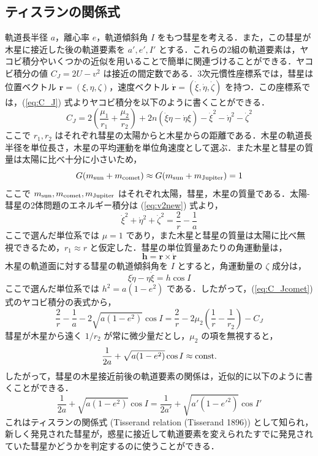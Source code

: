 \documentclass[11pt,a4paper,oneside,onecolumn]{jarticle}
\begin{document}
\subsection{ティスランの関係式}
軌道長半径 $a$，離心率 $e$，軌道傾斜角 $I$ をもつ彗星を考える．また，この彗星が木星に接近した後の軌道要素を $a', e', I'$ とする．これらの2組の軌道要素は，ヤコビ積分やいくつかの近似を用いることで簡単に関連づけることができる．ヤコビ積分の値 $C_J = 2 U - v^2$ は接近の間定数である．3次元慣性座標系では，彗星は位置ベクトル ${\bm r} = (\xi, \eta, \zeta)$，速度ベクトル $\dot{{\bm r}} = (\dot{\xi}, \dot{\eta}, \dot{\zeta})$ を持つ．この座標系では，(\ref{eq:C_J}) 式よりヤコビ積分を以下のように書くことができる．
\begin{equation}
C_J = 2 \left( \frac{\mu_1}{r_1} + \frac{\mu_2}{r_2} \right) + 2 n (\dot{\xi} \eta - \dot{\eta} \xi) - \dot{\xi}^2 - \dot{\eta}^2 - \dot{\zeta}^2 \label{eq:C_Jcomet}
\end{equation}
ここで $r_1, r_2$ はそれぞれ彗星の太陽からと木星からの距離である．木星の軌道長半径を単位長さ，木星の平均運動を単位角速度として選ぶ．また木星と彗星の質量は太陽に比べ十分に小さいため，
\begin{equation}
G (m_{\rm sun} + m_{\rm comet}) \approx G (m_{\rm sun} + m_{\rm Jupiter}) = 1
\end{equation}
ここで $m_{\rm sun}, m_{\rm comet}, m_{\rm Jupiter}$ はそれぞれ太陽，彗星，木星の質量である．太陽-彗星の2体問題のエネルギー積分は (\ref{eq:v2new}) 式より，
\begin{equation}
\dot{\xi}^2 + \dot{\eta}^2 + \dot{\zeta}^2 = \frac{2}{r} - \frac{1}{a}
\end{equation}
ここで選んだ単位系では $\mu = 1$ であり，また木星と彗星の質量は太陽に比べ無視できるため，$r_1 \approx r$ と仮定した．彗星の単位質量あたりの角運動量は，
\begin{equation}
{\bm h} = {\bm r} \times \dot{{\bm r}}
\end{equation}
木星の軌道面に対する彗星の軌道傾斜角を $I$ とすると，角運動量の $\zeta$ 成分は，
\begin{equation}
\xi \dot{\eta} - \eta \dot{\xi} = h \cos I
\end{equation}
ここで選んだ単位系では $h^2 = a (1 - e^2)$ である．したがって，(\ref{eq:C_Jcomet}) 式のヤコビ積分の表式から，
\begin{equation}
\frac{2}{r} - \frac{1}{a} - 2 \sqrt{a (1 - e^2)} \cos I = \frac{2}{r} - 2 \mu_2 \left( \frac{1}{r} - \frac{1}{r_2} \right) - C_J
\end{equation}
彗星が木星から遠く $1/r_2$ が常に微少量だとし，$\mu_2$ の項を無視すると，
\begin{equation}
\frac{1}{2a} + \sqrt{a (1 - e^2)} \cos I \approx {\rm const.}
\end{equation}
したがって，彗星の木星接近前後の軌道要素の関係は，近似的に以下のように書くことができる．
\begin{equation}
\frac{1}{2a} + \sqrt{a (1 - e^2)} \cos I = \frac{1}{2a'} + \sqrt{a' (1 - e'^2)} \cos I'
\end{equation}
これはティスランの関係式 (Tisserand relation (Tisserand 1896)) として知られ，新しく発見された彗星が，惑星に接近して軌道要素を変えられたすでに発見されていた彗星かどうかを判定するのに使うことができる．
\end{document}
